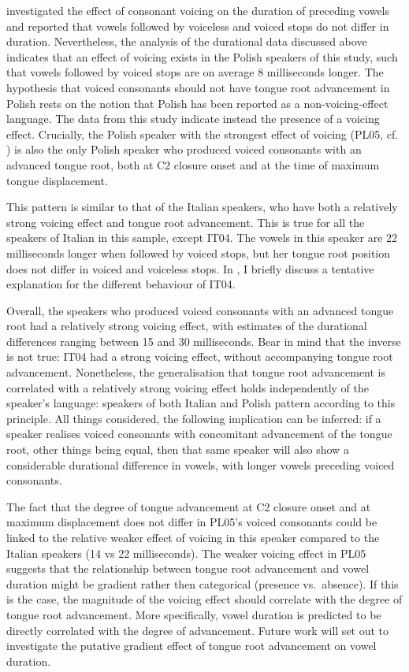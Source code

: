 \documentclass[authoryear, twocolumn]{elsarticle}
\begin{document}
\citet{keating1984} investigated the effect of consonant voicing on the
duration of preceding vowels and reported that vowels followed by
voiceless and voiced stops do not differ in duration. Nevertheless, the
analysis of the durational data discussed above indicates that an effect
of voicing exists in the Polish speakers of this study, such that vowels
followed by voiced stops are on average 8 milliseconds longer. The
hypothesis that voiced consonants should not have tongue root
advancement in Polish rests on the notion that Polish has been reported
as a non-voicing-effect language. The data from this study indicate
instead the presence of a voicing effect. Crucially, the Polish speaker
with the strongest effect of voicing (PL05, cf. )
is also the only Polish speaker who produced voiced consonants with an
advanced tongue root, both at C2 closure onset and at the time of
maximum tongue displacement.

This pattern is similar to that of the Italian speakers, who have both a
relatively strong voicing effect and tongue root advancement. This is
true for all the speakers of Italian in this sample, except IT04. The
vowels in this speaker are 22 milliseconds longer when followed by
voiced stops, but her tongue root position does not differ in voiced and
voiceless stops. In , I briefly discuss a tentative
explanation for the different behaviour of IT04.

Overall, the speakers who produced voiced consonants with an advanced
tongue root had a relatively strong voicing effect, with estimates of
the durational differences ranging between 15 and 30 milliseconds. Bear
in mind that the inverse is not true: IT04 had a strong voicing effect,
without accompanying tongue root advancement. Nonetheless, the
generalisation that tongue root advancement is correlated with a
relatively strong voicing effect holds independently of the speaker's
language: speakers of both Italian and Polish pattern according to this
principle. All things considered, the following implication can be
inferred: if a speaker realises voiced consonants with concomitant
advancement of the tongue root, other things being equal, then that same
speaker will also show a considerable durational difference in vowels,
with longer vowels preceding voiced consonants.

The fact that the degree of tongue advancement at C2 closure onset and
at maximum displacement does not differ in PL05's voiced consonants
could be linked to the relative weaker effect of voicing in this speaker
compared to the Italian speakers (14 vs 22 milliseconds). The weaker
voicing effect in PL05 suggests that the relationship between tongue
root advancement and vowel duration might be gradient rather then
categorical (presence vs.~absence). If this is the case, the magnitude
of the voicing effect should correlate with the degree of tongue root
advancement. More specifically, vowel duration is predicted to be
directly correlated with the degree of advancement. Future work will set
out to investigate the putative gradient effect of tongue root
advancement on vowel duration.
\end{document}
